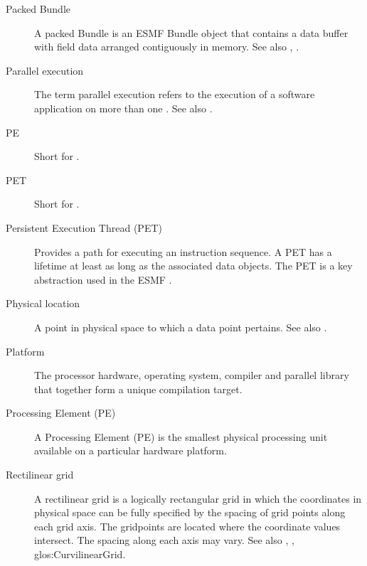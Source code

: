 \begin{description}
\label{glos:PackedBundle} 
\item[Packed Bundle] 
  A packed Bundle is an 
  ESMF Bundle object that contains
  a data buffer with field data arranged contiguously in memory. See 
  also , .

\label{glos:Parallel}
\item[Parallel execution]
  The term parallel execution refers to the execution of a software
  application on more than one .
  See also .

\label{glos:PE} 
\item[PE] 
  Short for .

\label{glos:PET} 
\item[PET] 
  Short for .

\label{glos:PermET} 
\item[Persistent Execution Thread (PET)] 
  Provides a
  path for executing an instruction sequence. A PET has a lifetime at least 
  as long as the associated data objects. The PET is a key abstraction 
  used in the ESMF .

\label{glos:PhysLoc} 
\item[Physical location] 
  A point in physical space to which a data point pertains.  See also
  .   

\label{glos:Platform} 
\item[Platform] 
  The processor hardware, operating system, compiler and
  parallel library that together form a unique compilation target.

\label{glos:Processing_Element}
\item[Processing Element (PE)] 
  A Processing Element (PE) is the smallest physical processing unit available
  on a particular hardware platform.

\label{glos:RectilinearGrid}
\item[Rectilinear grid]
  A rectilinear grid is a logically rectangular grid in which 
  the coordinates in physical space can be fully specified by
  the spacing of grid points along each grid axis.  The
  gridpoints are located where the coordinate values intersect.
  The spacing along each axis may vary.  
  See also ,
  , 
  {glos:CurvilinearGrid}.  


\end{description}
